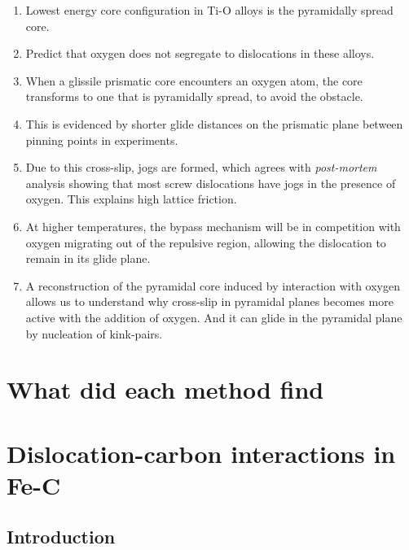 \documentclass[a4paper,12pt,oneside,print,numbered,index,PageStyleIII]{PhDThesisPSnPDF}
\begin{document}
\begin{enumerate}
\item Lowest energy core configuration in Ti-O alloys is the
pyramidally spread core.
\item Predict that oxygen does not segregate to dislocations in these
alloys.
\item When a glissile prismatic core encounters an oxygen atom, the
core transforms to one that is pyramidally spread, to avoid the
obstacle.
\item This is evidenced by shorter glide distances on the prismatic
plane between pinning points in experiments.
\item Due to this cross-slip, jogs are formed, which agrees with
\emph{post-mortem} analysis showing that most screw dislocations have
jogs in the presence of oxygen. This explains high lattice
friction.
\item At higher temperatures, the bypass mechanism will be in
competition with oxygen migrating out of the repulsive region,
allowing the dislocation to remain in its glide plane.
\item A reconstruction of the pyramidal core induced by interaction
with oxygen allows us to understand why cross-slip in pyramidal
planes becomes more active with the addition of oxygen. And it
can glide in the pyramidal plane by nucleation of kink-pairs.
\end{enumerate}








\chapter{What did each method find}
\label{sec:org9822d6f}

\chapter{}
\label{sec:org933235b}

\chapter{Dislocation-carbon interactions in Fe-C}
\label{sec:orgb88bba5}
\label{chapter:dislocation_carbon_FeC}

\section{Introduction}
\label{sec:orgabbe8cc}
\end{document}
